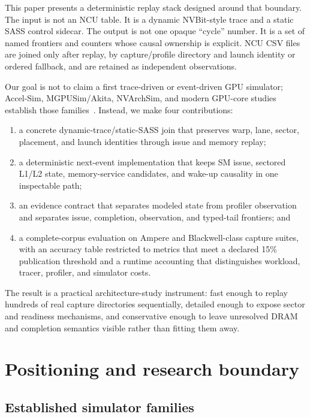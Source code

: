 \documentclass[10pt,letterpaper]{article}
\begin{document}
This paper presents a deterministic replay stack designed around that boundary.
The input is not an NCU table.  It is a dynamic NVBit-style trace and a static
SASS control sidecar.  The output is not one opaque ``cycle'' number.  It is a
set of named frontiers and counters whose causal ownership is explicit.  NCU
CSV files are joined only after replay, by capture/profile directory and launch
identity or ordered fallback, and are retained as independent observations.

Our goal is not to claim a first trace-driven or event-driven GPU simulator;
Accel-Sim, MGPUSim/Akita, NVArchSim, and modern GPU-core studies establish
those families~\cite{khairy2020accelsim,sun2019mgpusim,villa2021nvarchsim,huerta2025modern}.
Instead, we make four contributions:
\begin{enumerate}[leftmargin=1.35em,itemsep=2pt]
  \item a concrete dynamic-trace/static-SASS join that preserves warp, lane,
    sector, placement, and launch identities through issue and memory replay;
  \item a deterministic next-event implementation that keeps SM issue,
    sectored L1/L2 state, memory-service candidates, and wake-up causality in
    one inspectable path;
  \item an evidence contract that separates modeled state from profiler
    observation and separates issue, completion, observation, and typed-tail
    frontiers; and
  \item a complete-corpus evaluation on Ampere and Blackwell-class capture
    suites, with an accuracy table restricted to metrics that meet a declared
    15\% publication threshold and a runtime accounting that distinguishes
    workload, tracer, profiler, and simulator costs.
\end{enumerate}

The result is a practical architecture-study instrument: fast enough to replay
hundreds of real capture directories sequentially, detailed enough to expose
sector and readiness mechanisms, and conservative enough to leave unresolved
DRAM and completion semantics visible rather than fitting them away.

\section{Positioning and research boundary}
\label{sec:position}

\subsection{Established simulator families}
\end{document}
